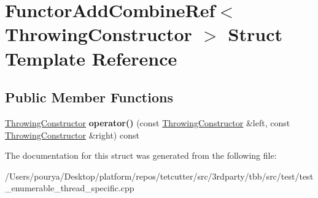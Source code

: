 \hypertarget{structFunctorAddCombineRef_3_01ThrowingConstructor_01_4}{}\section{Functor\+Add\+Combine\+Ref$<$ Throwing\+Constructor $>$ Struct Template Reference}
\label{structFunctorAddCombineRef_3_01ThrowingConstructor_01_4}
\subsection*{Public Member Functions}
\begin{DoxyCompactItemize}
\item 
\hypertarget{structFunctorAddCombineRef_3_01ThrowingConstructor_01_4_a0c2deccd81f1132c774384c96202149e}{}\hyperlink{classThrowingConstructor}{Throwing\+Constructor} {\bfseries operator()} (const \hyperlink{classThrowingConstructor}{Throwing\+Constructor} \&left, const \hyperlink{classThrowingConstructor}{Throwing\+Constructor} \&right) const \label{structFunctorAddCombineRef_3_01ThrowingConstructor_01_4_a0c2deccd81f1132c774384c96202149e}

\end{DoxyCompactItemize}


The documentation for this struct was generated from the following file\+:\begin{DoxyCompactItemize}
\item 
/\+Users/pourya/\+Desktop/platform/repos/tetcutter/src/3rdparty/tbb/src/test/test\+\_\+enumerable\+\_\+thread\+\_\+specific.\+cpp\end{DoxyCompactItemize}
